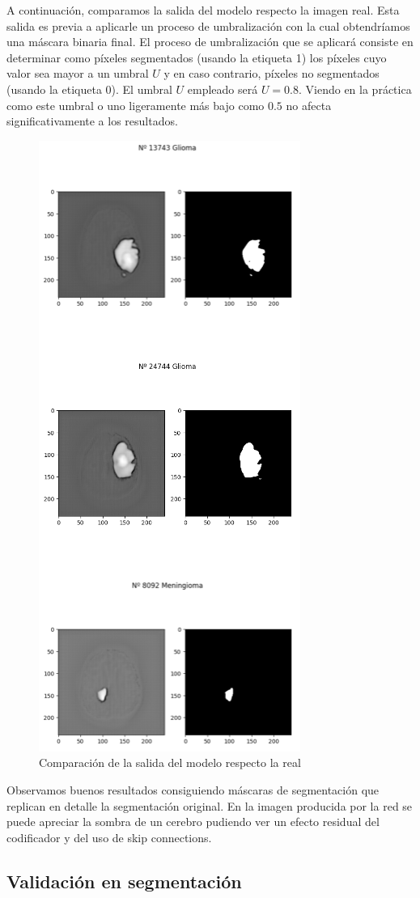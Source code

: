 A continuación, comparamos la salida del modelo respecto la imagen real. Esta salida es previa a aplicarle un proceso de umbralización con la cual obtendríamos una máscara binaria final. El proceso de umbralización que se aplicará consiste en determinar como píxeles segmentados (usando la etiqueta 1) los píxeles cuyo valor sea mayor a un umbral $U$ y en caso contrario, píxeles no segmentados (usando la etiqueta 0). El umbral $U$ empleado será $U = 0.8$. Viendo en la práctica como este umbral o uno ligeramente más bajo como $0.5$ no afecta significativamente a los resultados. 
\begin{figure}[H]
	\centering
	\includegraphics[width=0.5\linewidth]{imagenes/output_segmentation.png}
	\caption{Comparación de la salida del modelo respecto la real}
\end{figure}
Observamos buenos resultados consiguiendo máscaras de segmentación que replican en detalle la segmentación original. En la imagen producida por la red se puede apreciar la sombra de un cerebro pudiendo ver un efecto residual del codificador y del uso de skip connections.

\subsection{Validación en segmentación}

